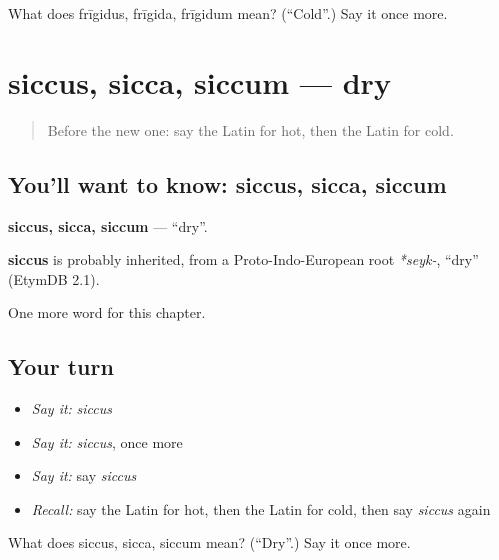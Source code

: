 \begin{tcolorbox}[breakable,colback=teal!4,colframe=teal!35!black,title={Before you move on}]
What does frīgidus, frīgida, frīgidum mean? (\textquotedblleft{}Cold\textquotedblright{}.) Say it once more.
\end{tcolorbox}
\section[siccus, sicca, siccum]{siccus, sicca, siccum — dry}

\label{lesson:LA-C95-siccus}



\begin{quote}
Before the new one: say the Latin for hot, then the Latin for cold.
\end{quote}

\subsection*{You'll want to know: siccus, sicca, siccum}
\textbf{siccus, sicca, siccum} — \textquotedblleft{}dry\textquotedblright{}.

\begin{cousinweb}
\textbf{siccus} is probably inherited, from a Proto-Indo-European root \emph{*seyk-}, \textquotedblleft{}dry\textquotedblright{} (EtymDB 2.1).
\end{cousinweb}

\begin{grammarlens}[title={What you've built}]
One more word for this chapter.
\end{grammarlens}

\subsection*{Your turn}
\begin{itemize}
\raggedright
  \item \emph{Say it:} \emph{siccus}
  \item \emph{Say it:} \emph{siccus}, once more
  \item \emph{Say it:} say \emph{siccus}
  \item \emph{Recall:} say the Latin for hot, then the Latin for cold, then say \emph{siccus} again
\end{itemize}

\begin{tcolorbox}[breakable,colback=teal!4,colframe=teal!35!black,title={Before you move on}]
What does siccus, sicca, siccum mean? (\textquotedblleft{}Dry\textquotedblright{}.) Say it once more.
\end{tcolorbox}
